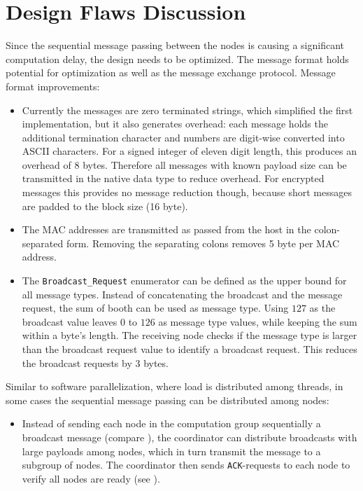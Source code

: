 \section{Design Flaws Discussion} \label{Design Flaws Detected Through Evaluation}

Since the sequential message passing between the nodes is causing a significant computation delay, the design needs to be optimized. The message format holds potential for optimization as well as the message exchange protocol.
Message format improvements:
\begin{itemize}
	\item Currently the messages are zero terminated strings, which simplified the first implementation, but it also generates overhead: each message holds the additional termination character and numbers are digit-wise converted into ASCII characters. For a signed integer of eleven digit length, this produces an overhead of 8 bytes. Therefore all messages with known payload size can be transmitted in the native data type to reduce overhead. For encrypted messages this provides no message reduction though, because short messages are padded to the block size (16 byte).
	\item The \gls{MAC} addresses are transmitted as passed from the host in the colon-separated form. Removing the separating colons removes 5 byte per \gls{MAC} address.
	\item The \lstinline|Broadcast_Request| enumerator can be defined as the upper bound for all message types.  Instead of concatenating the broadcast and the message request, the sum of booth can be used as message type. Using $127$ as the broadcast value leaves $0$ to $126$ as message type values, while keeping the sum within a byte's length. The receiving node checks if the message type is larger than the broadcast request value to identify a broadcast request. This reduces the broadcast requests by 3 bytes.
\end{itemize}

Similar to software parallelization, where load is distributed among threads, in some cases the sequential message passing can be distributed among nodes:
\begin{itemize}
	\item Instead of sending each node in the computation group sequentially a broadcast message (compare ), the coordinator can distribute broadcasts with large payloads among nodes, which in turn transmit the message to a subgroup of nodes. The coordinator then sends \lstinline|ACK|-requests to each node to verify all nodes are ready (see ).
\end{itemize}

